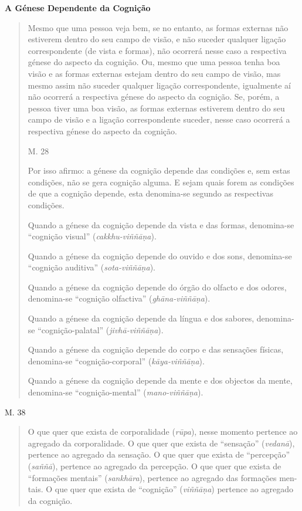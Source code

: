 \textbf{A Génese Dependente da Cognição}

\begin{quote}
Mesmo que uma pessoa veja bem, se no entanto, as formas externas não estiverem dentro do seu campo de visão, e não suceder qualquer ligação correspondente (de vista e formas), não ocorrerá nesse caso a respectiva génese do aspecto da cognição. Ou, mesmo que uma pessoa tenha boa visão e as formas externas estejam dentro do seu campo de visão, mas mesmo assim não suceder qualquer ligação correspondente, igualmente aí não ocorrerá a respectiva génese do aspecto da cognição. Se, porém, a pessoa tiver uma boa visão, as formas externas estiverem dentro do seu campo de visão e a ligação correspondente suceder, nesse caso ocorrerá a respectiva génese do aspecto da cognição.

M. 28

Por isso afirmo: a génese da cognição depende das condições e, sem estas condições, não se gera cognição alguma. E sejam quais forem as condições de que a cognição depende, esta denomina-se segundo as respectivas condições.

Quando a génese da cognição depende da vista e das formas, denomina-se ``cognição visual'' (\emph{cakkhu-viññāṇa}).

Quando a génese da cognição depende do ouvido e dos sons, denomina-se ``cognição auditiva'' (\emph{sota-viññāṇa}).

Quando a génese da cognição depende do órgão do olfacto e dos odores, denomina-se ``cognição olfactiva'' (\emph{ghāna-viññāṇa}).

Quando a génese da cognição depende da língua e dos sabores, denomina-se ``cognição-palatal'' (\emph{jivhā-viññāṇa}).

Quando a génese da cognição depende do corpo e das sensações físicas, denomina-se ``cognição-corporal'' (\emph{kāya-viññāṇa}).

Quando a génese da cognição depende da mente e dos objectos da mente, denomina-se ``cognição-mental'' (\emph{mano-viññāṇa}).
\end{quote}

M. 38

\begin{quote}
O que quer que exista de corporalidade (\emph{rūpa}), nesse momento pertence ao agregado da corporalidade. O que quer que exista de ``sensação'' (\emph{vedanā}), pertence ao agregado da sensação. O que quer que exista de ``percepção'' (\emph{saññā}), pertence ao agregado da percepção. O que quer que exista de ``formações mentais'' (\emph{sankhāra}), pertence ao agregado das formações men- tais. O que quer que exista de ``cognição'' (\emph{viññāṇa}) pertence ao agregado da cognição.
\end{quote}

